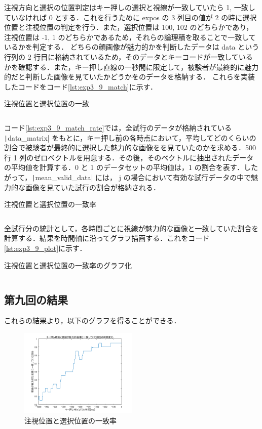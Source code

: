 \documentclass[dvipdfmx, titlepage, t]{jsarticle}
\begin{document}
    注視方向と選択の位置判定はキー押しの選択と視線が一致していたら 1, 一致していなければ 0 とする．これを行うために expos の 3 列目の値が 2 の時に選択位置と注視位置の判定を行う．また，選択位置は 100, 102 のどちらかであり，注視位置は -1, 1 のどちらかであるため，それらの論理積を取ることで一致しているかを判定する． どちらの顔画像が魅力的かを判断したデータは data という行列の 2 行目に格納されているため，そのデータとキーコードが一致しているかを確認する．また，キー押し直線の一秒間に限定して，被験者が最終的に魅力的だと判断した画像を見ていたかどうかをのデータを格納する．
    これらを実装したコードをコード\ref{lst:exp3_9_match}に示す．
    \begin{program}[H]
        \caption{注視位置と選択位置の一致}
        \inputminted[linenos,
        firstline=60,
        lastline=76,
        frame=lines,
        fontsize = \small]{matlab}{code/Exp3_9_Matlab.m}
        \label{lst:exp3_9_match}
    \end{program}
    コード\ref{lst:exp3_9_match_rate}では，全試行のデータが格納されている \texttt|data_matrix| をもとに，キー押し前の各時点において，平均してどのくらいの割合で被験者が最終的に選択した魅力的な画像をを見ていたのかを求める．500 行 1 列のゼロベクトルを用意する．その後，そのベクトルに抽出されたデータの平均値を計算する．0 と 1 のデータセットの平均値は，1 の割合を表す．したがって，\texttt|mean_valid_data| には， j の場合において有効な試行データの中で魅力的な画像を見ていた試行の割合が格納される．
    \begin{program}
        \caption{注視位置と選択位置の一致率}
        \inputminted[linenos,
        firstline=79,
        lastline=91,
        frame=lines,
        fontsize = \small]{matlab}{code/Exp3_9_Matlab.m}
        \label{lst:exp3_9_match_rate}
    \end{program}

    全試行分の統計として，各時間ごとに視線が魅力的な画像と一致していた割合を計算する．結果を時間軸に沿ってグラフ描画する．これをコード\ref{lst:exp3_9_plot}に示す．
    \begin{program}
        \caption{注視位置と選択位置の一致率のグラフ化}
        \inputminted[linenos,
        firstline=92,
        lastline=96,
        frame=lines,
        fontsize = \small]{matlab}{code/Exp3_9_Matlab.m}
        \label{lst:exp3_9_plot}
    \end{program}
    
    \subsection{第九回の結果}
    これらの結果より，以下のグラフを得ることができる．

    \begin{figure}[H]
        \centering
        \includegraphics[width=0.5\textwidth]{figure/g0310/lab3_2.png}
        \caption{注視位置と選択位置の一致率}
        \label{fig:exp3_9_plot}
    \end{figure}
\end{document}
